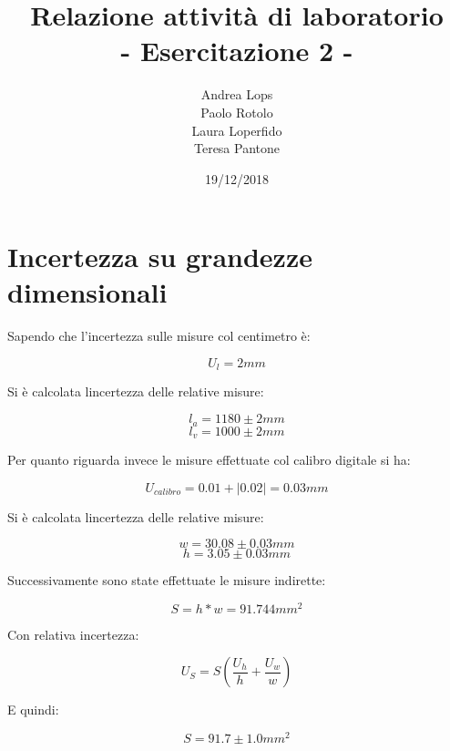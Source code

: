 \documentclass[a4paper]{article}
\title{\textbf{Relazione attività di laboratorio}\\{\normalsize - Esercitazione 2 -}}
\author{Andrea Lops\\
		Paolo Rotolo\\
		Laura Loperfido\\
		Teresa Pantone
	   }
\date{19/12/2018}
\begin{document}
\maketitle

\section {Incertezza su grandezze dimensionali}

Sapendo che l'incertezza sulle misure col centimetro è:
\begin{Large} 
	\begin{equation}
		U_{l} = 2mm
	 \end{equation}
\end{Large}
Si è calcolata lincertezza delle relative misure: 
\begin{Large} 
	\begin{equation}
		l_a = 1180\pm2mm
	 \end{equation}
	 \begin{equation}
		l_v = 1000\pm2mm
	 \end{equation}
\end{Large}
Per quanto riguarda invece le misure effettuate col calibro digitale si ha: 
\begin{Large} 
	\begin{equation}
		U_{calibro} = 0.01 + |0.02| = 0.03mm
	 \end{equation}
\end{Large}
Si è calcolata lincertezza delle relative misure: 
\begin{Large} 
	\begin{equation}
		w = 30.08\pm0.03mm
	 \end{equation}
	 \begin{equation}
		h = 3.05\pm0.03mm
	 \end{equation}
\end{Large}
Successivamente sono state effettuate le misure indirette:
\begin{Large} 
	\begin{equation}
		S = h*w = 91.744 mm^2
	 \end{equation}
\end{Large}
Con relativa incertezza:
\begin{Large} 
	\begin{equation}
		U_{S} =S(\frac{U_h}{h}+\frac{U_w}{w})
	 \end{equation}
\end{Large}
E quindi: 
\begin{Large} 
	\begin{equation}
		S =91.7\pm 1.0mm^2
	 \end{equation}
\end{Large}
\end{document}
